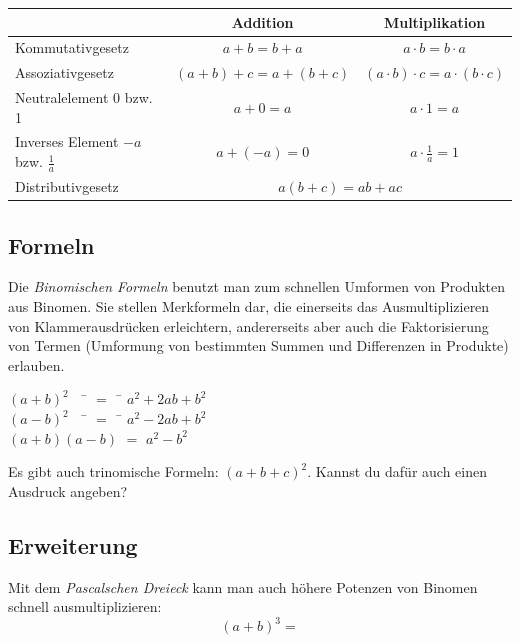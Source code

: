 \begin{tcolorbox}[colback=red!7!white,colframe=red!60!black,title=Arithmetische Grundgesetze]
	\begin{tabularx}{\linewidth}{|X|c|c|}
			\hline
			 & Addition & Multiplikation \\
			\hline
			Kommutativgesetz & $a+b=b+a$ & $a\cdot b = b\cdot a$ \\
			
			Assoziativgesetz & $(a+b)+c = a+ (b+c)$ & $(a\cdot b)\cdot c = a\cdot (b\cdot c)$ \\
			
			Neutralelement 0 bzw. 1 & $a+0 = a$ & $a\cdot 1 = a$ \\
			
			Inverses Element $-a$ bzw. $\displaystyle \frac{1}{a}$ & $a+(-a) = 0$ & $\displaystyle a\cdot \frac{1}{a} = 1$ \\
			\hline
			Distributivgesetz & \multicolumn{2}{|c|}{$a(b+c)=ab+ac$} \\
			\hline
		\end{tabularx}
		\label{law:arithmetic}
\end{tcolorbox}

\subsection*{Formeln}
Die \emph{Binomischen Formeln} benutzt man zum schnellen Umformen von Produkten aus Binomen. Sie stellen Merkformeln dar, die einerseits das Ausmultiplizieren von Klammerausdrücken erleichtern, andererseits aber auch die Faktorisierung von Termen (Umformung von bestimmten Summen und Differenzen in Produkte) erlauben.

\begin{tcolorbox}[colback=blue!7!white,colframe=blue!60!black,title=Binomische Formeln]
	\begin{tabbing}
		$(a+b)^2$ \qquad \, \, \= $=$ \, \= $a^2+2ab+b^2$ \\
		$(a-b)^2$ \qquad \, \, \= $=$ \, \= $a^2-2ab+b^2$ \\
		$(a+b)(a-b)$ \> $=$ \> $a^2-b^2$
	\end{tabbing}
\end{tcolorbox} 

Es gibt auch trinomische Formeln: $(a+b+c)^2$. Kannst du dafür auch einen Ausdruck angeben?
\vspace{2cm}

\subsection*{Erweiterung}
Mit dem \emph{Pascalschen Dreieck} kann man auch höhere Potenzen von Binomen schnell ausmultiplizieren:
\[
	(a+b)^3 =
\]


